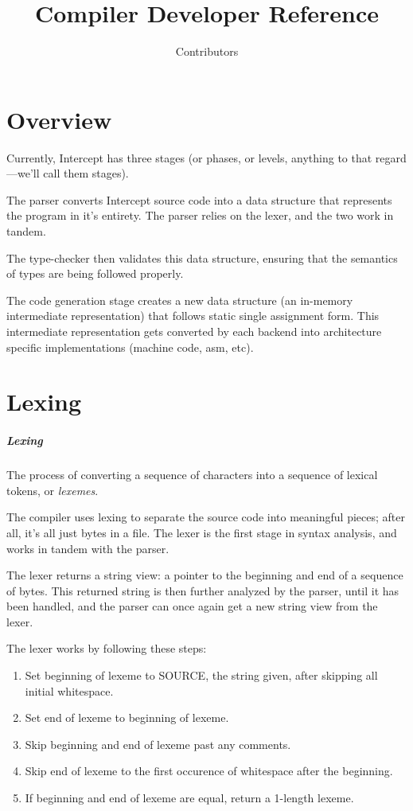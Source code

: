 \documentclass[
12pt,
letterpaper,
oneside,
]{memoir}
\title{\lang Compiler Developer Reference}
\author{Contributors}
\newcommand{\lang}{Intercept
}
\begin{document}
\maketitle
\clearpage

\tableofcontents
\clearpage

\chapter{Overview}

Currently, \lang has three stages (or phases, or levels, anything to that regard---we'll call them stages).

The parser converts \lang source code into a data structure that represents the program in it's entirety. The parser relies on the lexer, and the two work in tandem.

The type-checker then validates this data structure, ensuring that the semantics of types are being followed properly.

The code generation stage creates a new data structure (an in-memory intermediate representation) that follows static single assignment form.
This intermediate representation gets converted by each backend into
architecture specific implementations (machine code, asm, etc).

\chapter{Lexing}

\paragraph{Lexing} The process of converting a sequence of characters into a sequence of lexical tokens, or \emph{lexemes}.

The compiler uses lexing to separate the source code into meaningful pieces; after all, it's all just bytes in a file. The lexer is the first stage in syntax analysis, and works in tandem with the parser.

The lexer returns a string view: a pointer to the beginning and end of a sequence of bytes. This returned string is then further analyzed by the parser, until it has been handled, and the parser can once again get a new string view from the lexer.

\filbreak

The lexer works by following these steps:

\begin{enumerate}
\item Set beginning of lexeme to SOURCE, the string given, after skipping all initial whitespace.
\item Set end of lexeme to beginning of lexeme.
\item Skip beginning and end of lexeme past any comments.
\item Skip end of lexeme to the first occurence of whitespace after the beginning.
\item If beginning and end of lexeme are equal, return a 1-length lexeme.
\end{enumerate}
\end{document}
